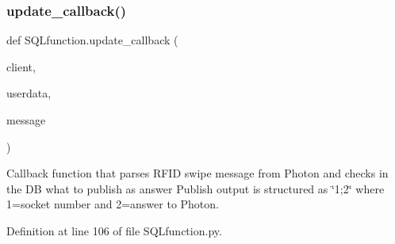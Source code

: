 \mbox{\label{namespace_s_q_lfunction_ae16644514ae2cdbf375884361531f691}} 
\subsubsection{\texorpdfstring{update\+\_\+callback()}{update\_callback()}}
{\footnotesize\ttfamily def S\+Q\+Lfunction.\+update\+\_\+callback (\begin{DoxyParamCaption}\item[{}]{client,  }\item[{}]{userdata,  }\item[{}]{message }\end{DoxyParamCaption})}



Callback function that parses R\+F\+ID swipe message from Photon and checks in the DB what to publish as answer Publish output is structured as \char`\"{}1;2\char`\"{} where 1=socket number and 2=answer to Photon. 



Definition at line 106 of file S\+Q\+Lfunction.\+py.


